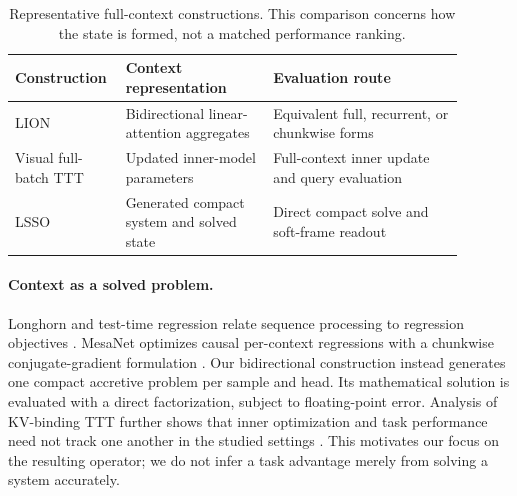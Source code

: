 \documentclass[10pt]{article}
\begin{document}
\begin{table}[t]
\centering
\small
\caption{Representative full-context constructions.  This comparison concerns
how the state is formed, not a matched performance ranking.}
\label{tab:full-context-designs}
\begin{tabular}{>{\raggedright\arraybackslash}p{0.18\linewidth}>{\raggedright\arraybackslash}p{0.31\linewidth}>{\raggedright\arraybackslash}p{0.40\linewidth}}
\toprule
Construction & Context representation & Evaluation route \\
\midrule
LION \cite{afzal2025lion} & Bidirectional linear-attention aggregates & Equivalent full, recurrent, or chunkwise forms \\
Visual full-batch TTT \cite{han2026vit3} & Updated inner-model parameters & Full-context inner update and query evaluation \\
LSSO & Generated compact system and solved state & Direct compact solve and soft-frame readout \\
\bottomrule
\end{tabular}
\end{table}

\paragraph{Context as a solved problem.}
Longhorn and test-time regression relate sequence processing to regression
objectives \cite{liu2024longhorn,wang2025testtimeregression}.  MesaNet optimizes
causal per-context regressions with a chunkwise conjugate-gradient formulation
\cite{vonoswald2026mesanet}.  Our bidirectional construction instead generates
one compact accretive problem per sample and head.  Its mathematical solution
is evaluated with a direct factorization, subject to floating-point error.
Analysis of KV-binding TTT further shows that inner optimization and task
performance need not track one another in the studied settings
\cite{liu2026kvbinding}.  This motivates our focus on the resulting operator;
we do not infer a task advantage merely from solving a system accurately.
\end{document}
